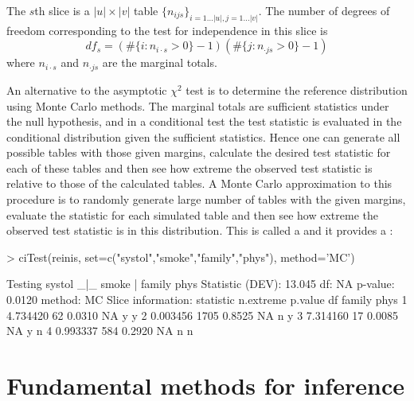 \documentclass[12pt]{article}
\begin{document}
The $s$th slice is a $|u|\times|v|$ table $\{n_{ijs}\}_{i=1\dots |u|,
  j=1 \dots |v|}$. The number of degrees of freedom corresponding to
the test for independence in this slice is
\begin{displaymath}
df_s=(\#\{i: n_{i\cdot  s}>0\}-1)(\#\{j: n_{\cdot js}>0\}-1)
\end{displaymath}
where $n_{i\cdot s}$ and
$n_{\cdot js}$ are the marginal totals.


An alternative to the asymptotic $\chi^2$ test is to determine the
reference distribution using Monte Carlo methods. The marginal totals
are sufficient statistics under the null hypothesis, and in a
conditional test the test statistic is evaluated in the conditional
distribution given the sufficient statistics. Hence one can generate
all possible tables with those given margins, calculate the desired
test statistic for each of these tables and then see how extreme the
observed test statistic is relative to those of the calculated
tables. A Monte Carlo approximation to this procedure is to randomly
generate large number of tables with the given margins, evaluate the
statistic for each simulated table and then see how extreme the
observed test statistic is in this distribution.  This is called a
 and it provides a :

\begin{Schunk}
\begin{Sinput}
> ciTest(reinis, set=c("systol","smoke","family","phys"), method='MC')
\end{Sinput}
\begin{Soutput}
Testing systol _|_ smoke | family phys 
Statistic (DEV):   13.045 df: NA p-value: 0.0120 method: MC
Slice information:
  statistic n.extreme p.value df family phys
1  4.734420        62  0.0310 NA      y    y
2  0.003456      1705  0.8525 NA      n    y
3  7.314160        17  0.0085 NA      y    n
4  0.993337       584  0.2920 NA      n    n
\end{Soutput}
\end{Schunk}

\section{Fundamental methods for inference}
\label{sec:fundamental}
\end{document}
